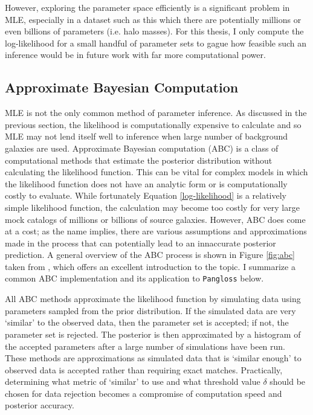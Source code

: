 \documentclass[%
 reprint,
 amsmath,amssymb,
 aps,nofootinbib
]{revtex4-1}
\begin{document}
However, exploring the parameter space efficiently is a significant problem in MLE, especially in a dataset such as this which there are potentially millions or even billions of parameters (i.e. halo masses). For this thesis, I only compute the log-likelihood for a small handful of parameter sets to gague how feasible such an inference would be in future work with far more computational power.

\subsection{Approximate Bayesian Computation} \label{abc}

MLE is not the only common method of parameter inference. As discussed in the previous section, the likelihood is computationally expensive to calculate and so MLE may not lend itself well to inference when large number of background galaxies are used. Approximate Bayesian computation (ABC) is a class of computational methods that estimate the posterior distribution without calculating the likelihood function. This can be vital for complex models in which the likelihood function does not have an analytic form or is computationally costly to evaluate. While fortunately Equation \eqref{log-likelihood} is a relatively simple likelihood function, the calculation may become too costly for very large mock catalogs of millions or billions of source galaxies. However, ABC does come at a cost; as the name implies, there are various assumptions and approximations made in the process that can potentially lead to an innaccurate posterior prediction. A general overview of the ABC process is shown in Figure \ref{fig:abc} taken from \cite{abc}, which offers an excellent introduction to the topic. I summarize a common ABC implementation and its application to \texttt{Pangloss} below.


All ABC methods approximate the likelihood function by simulating data using parameters sampled from the prior distribution. If the simulated data are very `similar' to the observed data, then the parameter set is accepted; if not, the parameter set is rejected. The posterior is then approximated by a histogram of the accepted parameters after a large number of simulations have been run. These methods are approximations as simulated data that is `similar enough' to observed data is accepted rather than requiring exact matches. Practically, determining what metric of `similar' to use and what threshold value $\delta$ should be chosen for data rejection becomes a compromise of computation speed and posterior accuracy.
\end{document}
